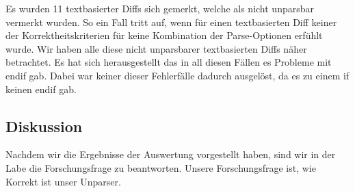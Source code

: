 Es wurden 11 textbasierter Diffs sich gemerkt, welche als nicht unparsbar vermerkt wurden. So ein Fall tritt auf, wenn für einen textbasierten Diff keiner der Korrektheitskriterien für keine Kombination der Parse-Optionen erfühlt wurde. Wir haben alle diese nicht unparsbarer textbasierten Diffs näher betrachtet. Es hat sich herausgestellt das in all diesen Fällen es Probleme mit endif gab. Dabei war keiner dieser Fehlerfälle dadurch ausgelöst, da es zu einem if keinen endif gab.


\subsection{Diskussion}
Nachdem wir die Ergebnisse der Auswertung vorgestellt haben, sind wir in der Labe die Forschungsfrage zu beantworten. Unsere Forschungsfrage ist, wie Korrekt ist unser Unparser. \\

